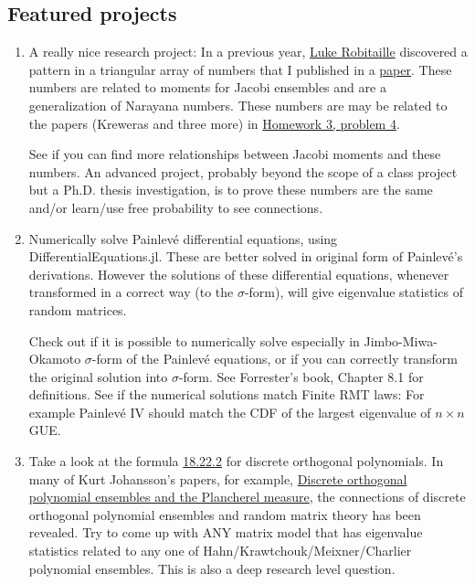 \documentclass{article}
\begin{document}
\subsection*{Featured projects}
\begin{enumerate}
\item  A really nice research project:  In a previous year, \href{https://github.com/mitmath/18338/blob/master/projects/2022/lr_report.pdf}{\color{blue}Luke Robitaille} discovered a pattern in a triangular array of numbers that I published in a \href{https://www.sciencedirect.com/science/article/pii/S0024379514007307}{\color{blue}paper}. These numbers are related to moments for Jacobi ensembles and are a generalization of Narayana numbers. These numbers are may be related to the papers (Kreweras and three more) in \href{https://github.com/mitmath/18338/blob/master/homeworks/fall2023hw3.pdf}{\color{blue}Homework 3, problem 4}. 

See if you can find more relationships between Jacobi moments and these numbers. An advanced project, probably beyond the scope of a class project but a Ph.D. thesis investigation, is to prove these numbers are the same and/or learn/use free probability to see connections.

\item Numerically solve Painlev{\'e} differential equations, using DifferentialEquations.jl. These are better solved in original form of Painlev{\'e}'s derivations. However the solutions of these differential equations, whenever transformed in a correct way (to the $\sigma$-form), will give eigenvalue statistics of random matrices. 

Check out if it is possible to numerically solve especially in Jimbo-Miwa-Okamoto $\sigma$-form of the Painlev{\'e} equations, or if you can correctly transform the original solution into $\sigma$-form. See Forrester's book, Chapter 8.1 for definitions. See if the numerical solutions match Finite RMT laws: For example Painlev{\'e} IV should match the CDF of the largest eigenvalue of $n\times n$ GUE. 

\item Take a look at the formula \href{http://dlmf.nist.gov/18.22#E2}{\color{blue}18.22.2} for discrete orthogonal polynomials. In many of Kurt Johansson's papers, for example, \href{https://www.jstor.org/stable/2661375}{\color{blue} Discrete orthogonal polynomial ensembles and the Plancherel measure}, the connections of discrete orthogonal polynomial ensembles and random matrix theory has been revealed. Try to come up with ANY matrix model that has eigenvalue statistics related to any one of Hahn/Krawtchouk/Meixner/Charlier polynomial ensembles. This is also a deep research level question. 
\end{enumerate}
\end{document}

